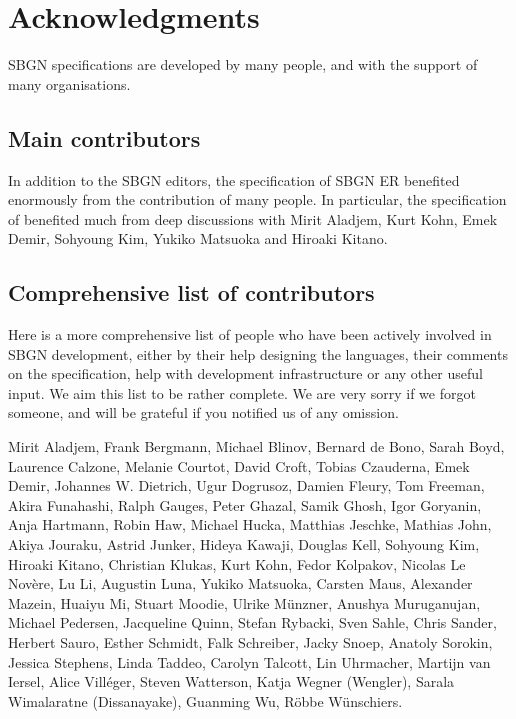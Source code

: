 \chapter{Acknowledgments}\label{sec:acknowledgments}

SBGN specifications are developed by many people, and with the support of many organisations.

\section{Main contributors}

In addition to the SBGN editors, the specification of SBGN ER benefited enormously from the contribution of many people. In particular, the specification of \SBGNERLone benefited much from deep discussions with Mirit Aladjem, Kurt Kohn, Emek Demir, Sohyoung Kim, Yukiko Matsuoka and Hiroaki Kitano. 

\section{Comprehensive list of contributors}

Here is a more comprehensive list of people who have been actively involved in SBGN development, either by their help designing the languages, their comments on the specification, help with development infrastructure or any other useful input.  We aim this list to be rather complete. We are very sorry if we forgot someone, and will be grateful if you notified us of any omission.

Mirit Aladjem, Frank Bergmann, Michael Blinov, Bernard de Bono, Sarah Boyd, Laurence Calzone, Melanie Courtot, David Croft, Tobias Czauderna, Emek Demir, Johannes W. Dietrich, Ugur Dogrusoz, Damien Fleury, Tom Freeman, Akira Funahashi, Ralph Gauges, Peter Ghazal, Samik Ghosh, Igor Goryanin, Anja Hartmann, Robin Haw, Michael Hucka, Matthias Jeschke, Mathias John, Akiya Jouraku, Astrid Junker, Hideya Kawaji, Douglas Kell, Sohyoung Kim, Hiroaki Kitano, Christian Klukas, Kurt Kohn, Fedor Kolpakov, Nicolas Le Nov\`{e}re, Lu Li, Augustin Luna, Yukiko Matsuoka, Carsten Maus, Alexander Mazein, Huaiyu Mi, Stuart Moodie, Ulrike M\"unzner, Anushya Muruganujan, Michael Pedersen, Jacqueline Quinn, Stefan Rybacki, Sven Sahle, Chris Sander, Herbert Sauro, Esther Schmidt, Falk Schreiber, Jacky Snoep, Anatoly Sorokin, Jessica Stephens, Linda Taddeo, Carolyn Talcott, Lin Uhrmacher, Martijn van Iersel, Alice Vill\'{e}ger, Steven Watterson, Katja Wegner (Wengler), Sarala Wimalaratne (Dissanayake), Guanming Wu, R\"obbe W\"unschiers.

